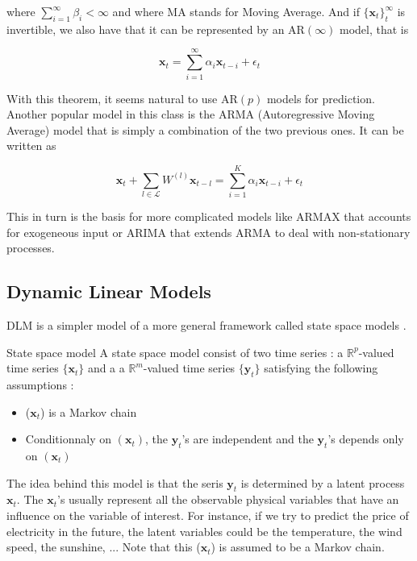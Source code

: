 \documentclass{article}
\begin{document}
where $\sum_{i=1}^\infty \beta_i < \infty$ and where MA stands for Moving Average. And if $\{ \mathbf{x}_t \}_t^\infty$ is invertible, we also have that it can be represented by an AR$(\infty)$ model, that is

$$\mathbf{x}_t = \sum_{i=1}^{\infty} \alpha_i \mathbf{x}_{t-i} + \epsilon_t$$

With this theorem, it seems natural to use AR$(p)$ models for prediction. \\

Another popular model in this class is the ARMA (Autoregressive Moving Average) model that is simply a combination of the two previous ones. It can be written as

$$\mathbf{x}_t + \sum_{l \in \mathcal{L}} W^{(l)} \mathbf{x}_{t-l} = \sum_{i=1}^{K} \alpha_i \mathbf{x}_{t-i} + \epsilon_t$$

This in turn is the basis for more complicated models like ARMAX that accounts for exogeneous input or ARIMA that extends ARMA to deal with non-stationary processes.

\subsection*{Dynamic Linear Models}
DLM is a simpler model of a more general framework called state space models \cite{DLMR}. \\

\begin{definition}{State space model}
A state space model consist of two time series : a $\mathbb{R}^p$-valued time series $\{\mathbf{x}_t\}$ and a a $\mathbb{R}^m$-valued time series $\{\mathbf{y}_t\}$ satisfying the following assumptions :

\begin{itemize}
        \item ($\mathbf{x}_t$) is a Markov chain
        \item Conditionnaly on $(\mathbf{x}_t)$, the $\mathbf{y}_t$'s are independent and the $\mathbf{y}_t$'s depends only on $(\mathbf{x}_t)$
\end{itemize}
\label{statespace}
\end{definition}

The idea behind this model is that the seris $\mathbf{y}_t$ is determined by a latent process $\mathbf{x}_t$. The $\mathbf{x}_t$'s usually represent all the observable physical variables that have an influence on the variable of interest. For instance, if we try to predict the price of electricity in the future, the latent variables could be the temperature, the wind speed, the sunshine, ... Note that this ($\mathbf{x}_t$) is assumed to be a Markov chain. \\
\end{document}
